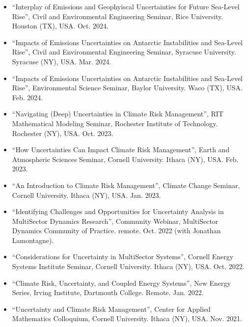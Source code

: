 \documentclass[11pt,article,oneside]{memoir}
\begin{document}
\begin{itemize}[label={}]

\item \enquote{Interplay of Emissions and Geophyiscal Uncertainties for Future Sea-Level Rise}, Civil and Environmental Engineering Seminar,  Rice University. Houston (TX), USA. Oct. 2024.

\item \enquote{Impacts of Emissions Uncertainties on Antarctic Instabilities and Sea-Level Rise}, Civil and Environmental Engineering Seminar,  Syracuse University. Syracuse (NY), USA. Mar. 2024.

\item \enquote{Impacts of Emissions Uncertainties on Antarctic Instabilities and Sea-Level Rise}, Environmental Science Seminar,  Baylor University. Waco (TX), USA. Feb. 2024.

\item \enquote{Navigating (Deep) Uncertainties in Climate Risk Management}, RIT Mathematical Modeling Seminar,  Rochester Institute of Technology. Rochester (NY), USA. Oct. 2023.

\item \enquote{How Uncertainties Can Impact Climate Risk Management}, Earth and Atmospheric Sciences Seminar,  Cornell University. Ithaca (NY), USA. Feb. 2023.

\item \enquote{An Introduction to Climate Risk Management}, Climate Change Seminar,  Cornell University. Ithaca (NY), USA. Jan. 2023.

\item \enquote{Identifying Challenges and Opportunities for Uncertainty Analysis in MultiSector Dynamics Research}, Community Webinar,  MultiSector Dynamics Community of Practice. remote. Oct. 2022 (with Jonathan Lamontagne).

\item \enquote{Considerations for Uncertainty in MultiSector Systems}, Cornell Energy Systems Institute Seminar,  Cornell University. Ithaca (NY), USA. Oct. 2022.

\item \enquote{Climate Risk, Uncertainty, and Coupled Energy Systems}, New Energy Series, Irving Institute,  Dartmouth College. Remote. Jan. 2022.

\item \enquote{Uncertainty and Climate Risk Management}, Center for Applied Mathematics Colloquium,  Cornell University. Ithaca (NY), USA. Nov. 2021.


\end{itemize}
\end{document}

